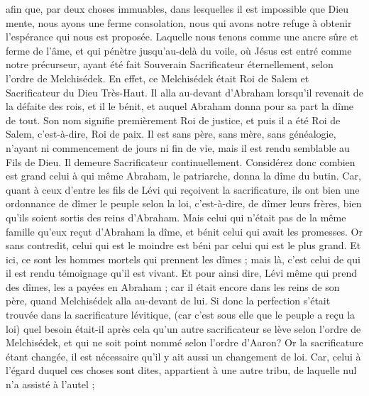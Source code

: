 \begin{multicols}{2}
afin que, par deux choses immuables, dans lesquelles il est impossible que Dieu mente, nous ayons une ferme consolation, nous qui avons notre refuge à obtenir l'espérance qui nous est proposée.
Laquelle nous tenons comme une ancre sûre et ferme de l'âme, et qui pénètre jusqu'au-delà du voile,
où Jésus est entré comme notre précurseur, ayant été fait Souverain Sacrificateur éternellement, selon l'ordre de Melchisédek.
\VerseOne{}En effet, ce Melchisédek était Roi de Salem et Sacrificateur du Dieu Très-Haut. Il alla au-devant d'Abraham lorsqu'il revenait de la défaite des rois, et il le bénit,
et auquel Abraham donna pour sa part la dîme de tout. Son nom signifie premièrement Roi de justice, et puis il a été Roi de Salem, c'est-à-dire, Roi de paix.
Il est sans père, sans mère, sans généalogie, n'ayant ni commencement de jours ni fin de vie, mais il est rendu semblable au Fils de Dieu. Il demeure Sacrificateur continuellement.
Considérez donc combien est grand celui à qui même Abraham, le patriarche, donna la dîme du butin.
Car, quant à ceux d'entre les fils de Lévi qui reçoivent la sacrificature, ils ont bien une ordonnance de dîmer le peuple selon la loi, c'est-à-dire, de dîmer leurs frères, bien qu'ils soient sortis des reins d'Abraham.
Mais celui qui n'était pas de la même famille qu'eux reçut d'Abraham la dîme, et bénit celui qui avait les promesses.
Or sans contredit, celui qui est le moindre est béni par celui qui est le plus grand.
Et ici, ce sont les hommes mortels qui prennent les dîmes ; mais là, c'est celui de qui il est rendu témoignage qu'il est vivant.
Et pour ainsi dire, Lévi même qui prend des dîmes, les a payées en Abraham ;
car il était encore dans les reins de son père, quand Melchisédek alla au-devant de lui.
Si donc la perfection s'était trouvée dans la sacrificature lévitique, (car c'est sous elle que le peuple a reçu la loi) quel besoin était-il après cela qu'un autre sacrificateur se lève selon l'ordre de Melchisédek, et qui ne soit point nommé selon l'ordre d'Aaron?
Or la sacrificature étant changée, il est nécessaire qu'il y ait aussi un changement de loi.
Car, celui à l'égard duquel ces choses sont dites, appartient à une autre tribu, de laquelle nul n'a assisté à l'autel ;

\end{multicols}
